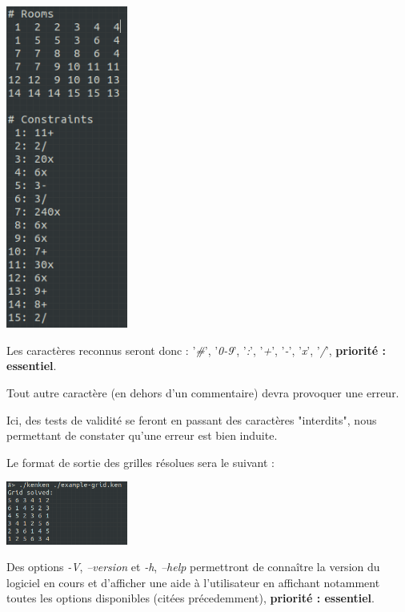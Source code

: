 \documentclass[1]{report}
\begin{document}
\begin{itemize}
\begin{center}
                \includegraphics[width=4cm]{Entree.png}

            \end{center}

            Les caractères reconnus seront donc : '\emph{\#}', '\emph{0-9}', '\emph{:}', '\emph{+}', '\emph{-}', '\emph{x}', '\emph{/}', \textbf{priorité : essentiel}.

            Tout autre caractère (en dehors d'un commentaire) devra provoquer une erreur.

            Ici, des tests de validité se feront en passant des caractères "interdits", nous permettant de constater qu'une erreur est bien induite.

            Le format de sortie des grilles résolues sera le suivant : \\

            \begin{center}

                \includegraphics[width=4cm]{Sortie.png}

            \end{center}



            Des options \emph{-V}, \emph{--version} et \emph{-h}, \emph{--help} permettront de connaître la version du logiciel en cours et d'afficher une aide à l'utilisateur en affichant notamment toutes les options disponibles (citées précedemment), \textbf{priorité : essentiel}. \\


\end{itemize}
\end{document}
